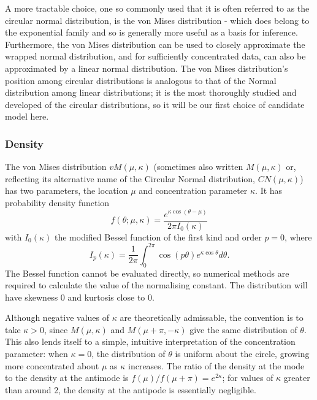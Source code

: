 \documentclass[../../ArchStats.tex]{subfiles}
\begin{document}
A more tractable choice, one so commonly used that it is often referred to as the circular normal distribution, is the von Mises distribution - which does belong to the exponential family and so is generally more useful as a basis for inference. Furthermore, the von Mises distribution can be used to closely approximate the wrapped normal distribution, and for sufficiently concentrated data, can also be approximated by a linear normal distribution. The von Mises distribution's position among circular distributions is analogous to that of the Normal  distribution among linear distributions; it is the most thoroughly studied and developed of the circular distributions, so it will be our first choice of candidate model here. %

\subsubsection{Density}
The von Mises distribution $vM(\mu, \kappa)$ (sometimes also written $M(\mu, \kappa)$ or, reflecting its alternative name of the Circular Normal distribution, $CN(\mu, \kappa)$) has two parameters, the location $\mu$ and concentration parameter $\kappa$. It has probability density function 
\[f(\theta; \mu, \kappa) = \frac{e^{\kappa \cos(\theta - \mu)}}{2\pi I_0(\kappa)}\]
with $I_0(\kappa)$ the modified Bessel function of the first kind and order $p=0$, where
\begin{equation}
\label{eq:mod-Bessel}
I_p(\kappa) = \frac{1}{2\pi}\int_0^{2\pi} \cos(p\theta)e^{\kappa \cos \theta} d\theta.
\end{equation}
The Bessel function cannot be evaluated directly, so numerical methods are required to calculate the value of the normalising constant. The distribution will have skewness 0 and kurtosis close to 0.


Although negative values of $\kappa$ are theoretically admissable, the convention is to take $\kappa > 0$, since $M(\mu, \kappa)$ and $M(\mu + \pi, -\kappa)$ give the same distribution of $\theta$. This also lends itself to a simple, intuitive interpretation of the concentration parameter: when $\kappa = 0$, the distribution of $\theta$ is uniform about the circle, growing more concentrated about $\mu$ as $\kappa$ increases.  The ratio of the density at the mode to the density at the antimode is $f(\mu) / f(\mu + \pi) = e^{2\kappa}$; for values of $\kappa$ greater than around 2, the density at the antipode is essentially negligible. 
\end{document}
